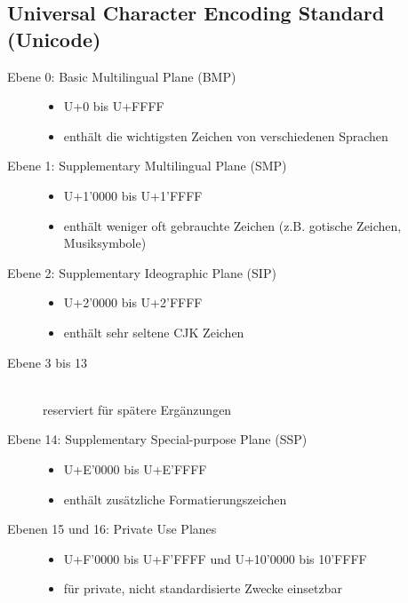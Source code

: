 \documentclass[a4paper,10pt]{article}
\begin{document}
\subsection{Universal Character Encoding Standard (Unicode)}
\begin{description}
	\item[Ebene 0: Basic Multilingual Plane (BMP)] \hfill
		\begin{itemize}
			\item U+0 bis U+FFFF
			\item enth\"alt die wichtigsten Zeichen von verschiedenen Sprachen
		\end{itemize}
	\item[Ebene 1: Supplementary Multilingual Plane (SMP)] \hfill
		\begin{itemize}
			\item U+1'0000 bis U+1'FFFF
			\item enth\"alt weniger oft gebrauchte Zeichen (z.B. gotische Zeichen, Musiksymbole)
		\end{itemize}
	\item[Ebene 2: Supplementary Ideographic Plane (SIP)] \hfill
		\begin{itemize}
			\item U+2'0000 bis U+2'FFFF
			\item enth\"alt sehr seltene CJK Zeichen
		\end{itemize}
	\item[Ebene 3 bis 13] \hfill \\
		reserviert f\"ur sp\"atere Erg\"anzungen
	\item[Ebene 14: Supplementary Special-purpose Plane (SSP)] \hfill
		\begin{itemize}
			\item U+E'0000 bis U+E'FFFF
			\item enth\"alt zus\"atzliche Formatierungszeichen
		\end{itemize}
	\item[Ebenen 15 und 16: Private Use Planes] \hfill
		\begin{itemize}
			\item U+F'0000 bis U+F'FFFF und U+10'0000 bis 10'FFFF
			\item f\"ur private, nicht standardisierte Zwecke einsetzbar
		\end{itemize}
\end{description}
\end{document}
